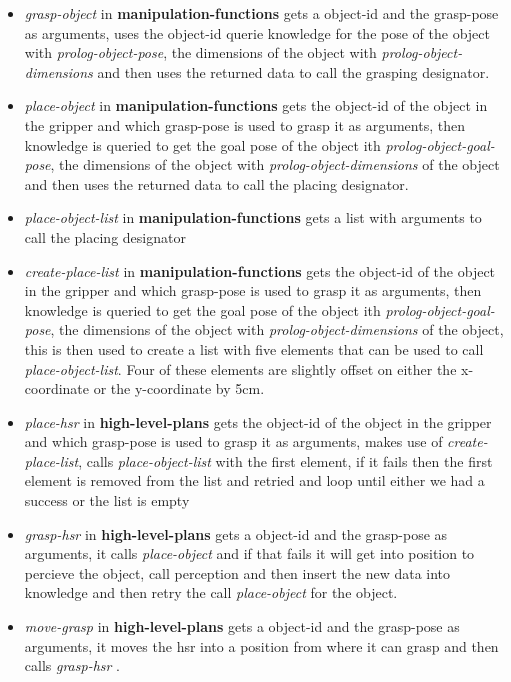 \documentclass[main.tex]{subfiles}
\begin{document}
	                    \begin{itemize}  
			              \item \textit{grasp-object} in \textbf{manipulation-functions} gets a object-id and the grasp-pose as arguments, uses the object-id querie knowledge for the pose of the object with \textit{prolog-object-pose}, the dimensions of the object with \textit{prolog-object-dimensions} and then uses the returned data to call the grasping designator.
		                  \item \textit{place-object} in \textbf{manipulation-functions} gets the object-id of the object in the gripper and which grasp-pose is used to grasp it as arguments, then knowledge is queried to get the goal pose of the object ith \textit{prolog-object-goal-pose}, the dimensions of the object with \textit{prolog-object-dimensions} of the object and then uses the returned data to call the placing designator.
		                  \item \textit{place-object-list} in \textbf{manipulation-functions}
		                  gets a list with arguments to call the placing designator 
		                  \item \textit{create-place-list} in \textbf{manipulation-functions} 
		                  gets the object-id of the object in the gripper and which grasp-pose is used to grasp it as arguments, then knowledge is queried to get the goal pose of the object ith \textit{prolog-object-goal-pose}, the dimensions of the object with \textit{prolog-object-dimensions} of the object, this is then used to create a list with five elements that can be used to call \textit{place-object-list}. Four of these elements are slightly offset on either the x-coordinate or the y-coordinate by 5cm.  
		                  \item \textit{place-hsr} in \textbf{high-level-plans}  gets the object-id of the object in the gripper and which grasp-pose is used to grasp it as arguments, makes use of \textit{create-place-list}, calls \textit{place-object-list} with the first element, if it fails then the first element is removed from the list and retried and loop until either we had a success or the list is empty
		                  \item \textit{grasp-hsr} in \textbf{high-level-plans} gets a object-id and the grasp-pose as arguments, it calls \textit{place-object} and if that fails it will get into position to percieve the object, call perception and then insert the new data into knowledge and then retry the call \textit{place-object} for the object.
		                  \item \textit{move-grasp} in \textbf{high-level-plans} gets a object-id and the grasp-pose as arguments, it moves the hsr into a position from where it can grasp and then calls \textit{grasp-hsr }.
                  
	                  \end{itemize}
\end{document}
